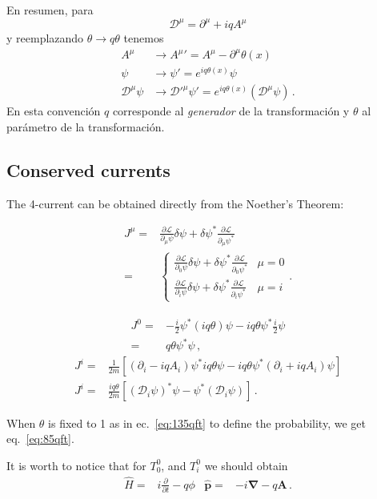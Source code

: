 En resumen, para 
\begin{equation}
  \mathcal{D}^\mu=\partial^\mu+iqA^\mu
\end{equation}
y reemplazando $\theta\to q\theta$ tenemos
\begin{align}
   A^\mu&\to{A^\mu}'=A^\mu-\partial^\mu\theta(x)\nonumber\\
   \psi&\to \psi'=e^{iq\theta(x)}\psi\nonumber\\
  \mathcal{D}^\mu\psi&\to {\mathcal{D}'}^\mu\psi'=e^{iq\theta(x)}(\mathcal{D}^\mu\psi)\,.
\end{align}
En esta convención $q$ corresponde al \emph{generador} de la transformación y $\theta$ al parámetro de la transformación.


\subsection{Conserved currents}
\begin{frame}
The 4-current can be obtained directly from the Noether's Theorem:

\begin{align}
  J^\mu=&\frac{\partial\mathcal{L}}{\partial_\mu\psi}\delta\psi+\delta\psi^*\frac{\partial\mathcal{L}}{\partial_\mu\psi^*}\nonumber\\
=&\begin{cases}
  \frac{\partial\mathcal{L}}{\partial_0\psi}\delta\psi+\delta\psi^*\frac{\partial\mathcal{L}}{\partial_0\psi^*}&\mu=0\\
  \frac{\partial\mathcal{L}}{\partial_i\psi}\delta\psi+\delta\psi^*\frac{\partial\mathcal{L}}{\partial_i\psi^*}&\mu=i
\end{cases}.
\end{align}

\begin{align}
  J^0=&-\frac{i}{2}\psi^*(iq\theta)\psi-iq\theta\psi^*\frac{i}{2}\psi\nonumber\\
  =&q\theta\psi^*\psi\,,
\end{align}
\begin{align}
  J^i=&\frac{1}{2m}\left[\left(\partial_i-iqA_i\right)\psi^*iq\theta\psi-iq\theta\psi^*\left(\partial_i+iqA_i\right)\psi\right]\nonumber\\
  J^i=&\frac{iq\theta}{2m}\left[\left(\mathcal{D}_i\psi\right)^*\psi-\psi^*\left(\mathcal{D}_i\psi\right)\right]\,.
  \end{align}

When $\theta$ is fixed to 1 as in ec.~\eqref{eq:135qft} to define the probability, we get eq.~\eqref{eq:85qft}.

It is worth to notice that for $T^0_0$, and $T^0_i$ we should obtain
\begin{align}
  \widehat{H}=& i\frac{\partial}{\partial t}-q\phi & \widehat{\mathbf{p}}=&-i\boldsymbol{\nabla}-q\mathbf{A}\,.
\end{align}

\end{frame}
